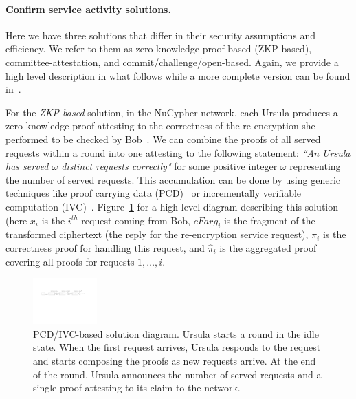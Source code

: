 \documentclass{llncs}
\begin{document}
\paragraph{Confirm service activity solutions.} Here we have three solutions that differ in their security assumptions and efficiency. We refer to them as zero knowledge proof-based (ZKP-based), committee-attestation, and commit/challenge/open-based. Again, we provide a high level description in what follows while a more complete version can be found in~\cite{confirm-activity-draft}. 


For the \emph{ZKP-based} solution, in the NuCypher network, each Ursula produces a zero knowledge proof attesting to the correctness of the re-encryption she performed to be checked by Bob~\cite{umbral2018}. We can combine the proofs of all served requests within a round into one attesting to the following statement: \emph{``An Ursula has served $\omega$ distinct requests correctly"} for some positive integer $\omega$ representing the number of served requests. This accumulation can be done by using generic techniques like proof carrying data (PCD)~\cite{chiesa2010proof} or incrementally verifiable computation (IVC)~\cite{valiant08}. Figure~\ref{pcd-based-sol} for a high level diagram describing this solution (here $x_i$ is the $i^{th}$ request coming from Bob, $cFarg_i$ is the fragment of the transformed ciphertext (the reply for the re-encryption service request), $\pi_i$ is the correctness proof for handling this request, and $\hat{\pi}_i$ is the aggregated proof covering all proofs for requests $1, \dots, i$.


\begin{figure}[t!]
\centerline{
\includegraphics[height= 0.7in, width = 1.0\columnwidth]{figures/pcd-based-sol.pdf}}
\caption{PCD/IVC-based solution diagram. Ursula starts a round in the idle state. When 
the first request arrives, Ursula responds to the request and starts composing the 
proofs as new requests arrive. At the end of the round, Ursula announces the number of 
served requests and a single proof attesting to its claim to the network. }
\label{pcd-based-sol}
\end{figure}
\end{document}
